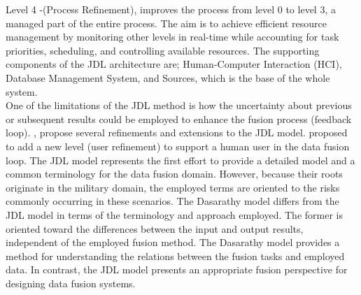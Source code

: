 Level 4 -(Process Refinement), improves the process from level 0 to level 3, a managed part of the entire process. The aim is to achieve efficient resource management by monitoring other levels in real-time while accounting for task priorities, scheduling, and controlling available resources. The supporting components of the JDL architecture are;
Human-Computer Interaction (HCI), %
Database Management System, %
 and Sources, which is the base of the whole system.\\ %
 
One of the limitations of the JDL method is how the uncertainty about previous or subsequent results could be employed to enhance the fusion process (feedback loop). \cite{liggins2009handbook}, propose several refinements and extensions to the JDL model. \cite{blasch2010high} proposed to add a new level (user refinement) to support a human user in the data fusion loop. The JDL model represents the first effort to provide a detailed model and a common terminology for the data fusion domain. However, because their roots originate in the military domain, the employed terms are oriented to the risks commonly occurring in these scenarios.  
The Dasarathy model differs from the JDL model in terms of the terminology and approach employed. The former is oriented toward the differences between the input and output results, independent of the employed fusion method. The Dasarathy model provides a method for understanding the relations between the fusion tasks and employed data. In contrast, the JDL model presents an appropriate fusion perspective for designing data fusion systems. 
